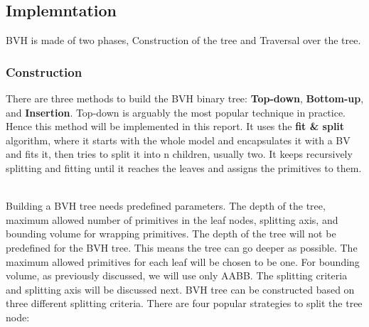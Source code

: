 \documentclass[11pt,a4paper]{article}
\begin{document}
\subsection{Implemntation}
BVH is made of two phases, Construction of the tree and Traversal over the tree.  

\subsubsection{Construction}
There are three methods to build the BVH binary tree: \textbf{Top-down}, \textbf{Bottom-up}, and \textbf{Insertion}. Top-down is arguably the most popular technique in practice. Hence this method will be implemented in this report. It uses the \textbf{fit \& split} algorithm, where it starts with the whole model and encapsulates it with a BV and fits it, then tries to split it
into n children, usually two. It keeps recursively splitting and fitting until it reaches the leaves and assigns the primitives to them.


\noindent
\\
Building a BVH tree needs predefined parameters. The depth of the tree, maximum allowed number of primitives in the leaf nodes, splitting axis, and bounding volume for wrapping primitives. The depth of the tree will not be predefined for the BVH tree. This means the tree can go deeper as possible. The maximum allowed primitives for each leaf will be chosen to be one. For bounding volume, as previously discussed, we will use only AABB. The splitting criteria and splitting axis will be discussed next.  
BVH tree can be constructed based on three different splitting criteria. There are four popular strategies to split the tree node:
\end{document}
